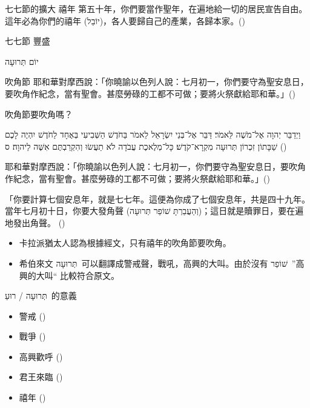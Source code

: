 \documentclass{beamer}
\makeatletter
\newcommand{\biblerefhebrew}[1]{\brm@bibleref{hebrew}{#1}}
\newcommand{\topic}[1]{
\begin{frame}
    \centering
    \vspace*{1cm}
    {\fontsize{40}{48}\selectfont #1\par}
    \vfill
\end{frame}
}
\newcommand{\conclusion}[2]{
\begin{frame}
    \centering
    \vspace*{1cm}
    {\fontsize{40}{48}\selectfont #1 \textemdash #2\par}
    \vfill
\end{frame}
}
\newcommand{\parvspace}{\par\vspace{0.5em}}
\makeatother
\begin{document}
\begin{frame}{七七節的擴大 \textemdash 禧年}
	第五十年，你們要當作\alert{聖年}，在遍地給一切的居民\alert{宣告自由}。這年必為你們的禧年 (\texthebrew{יוֹבֵל})，各人要\alert{歸自己的產業}，\alert{各歸本家}。()
\end{frame}

\conclusion{七七節}{豐盛}

\topic{\texthebrew{יוֹם תְּרוּעָה}}

\begin{frame}{吹角節}
	耶和華對摩西說：「你曉諭以色列人說：\alert{七月初一}，你們要守為\alert{聖安息日}，要吹角作紀念，當有聖會。甚麼勞碌的工都不可做；要將火祭獻給耶和華。」()\parvspace
\end{frame}

\begin{frame}{吹角節要吹角嗎？}
	\begin{hebrew}וַיְדַבֵּר יְהוָה אֶל־מֹשֶׁה לֵּאמֹר׃ דַּבֵּר אֶל־בְּנֵי יִשְׂרָאֵל לֵאמֹר בַּחֹדֶשׁ הַשְּׁבִיעִי בְּאֶחָד לַחֹדֶשׁ יִהְיֶה לָכֶם שַׁבָּתוֹן זִכְרוֹן \alert{תְּרוּעָה} מִקְרָא־קֹדֶשׁ׃ כָּל־מְלֶאכֶת עֲבֹדָה לֹא תַעֲשׂוּ וְהִקְרַבְתֶּם אִשֶּׁה לַיהוָה׃ ס (\biblerefhebrew{Lv 23:23-25})\end{hebrew}\parvspace
	耶和華對摩西說：「你曉諭以色列人說：\alert{七月初一}，你們要守為\alert{聖安息日}，要吹角作紀念，當有聖會。甚麼勞碌的工都不可做；要將火祭獻給耶和華。」()\parvspace
	「你要計算七個安息年，就是七七年。這便為你成了七個安息年，共是四十九年。 當年七月初十日，你要\alert{大發角聲 (\texthebrew{וְהַעֲבַרְתָּ שׁוֹפַר תְּרוּעָה})}；這日就是贖罪日，要在遍地發出角聲。 ()\parvspace
	\begin{itemize}
		\item 卡拉派猶太人認為根據經文，只有禧年的吹角節要吹角。\parencite{Karaism}
		\item 希伯來文 \texthebrew{תְּרוּעָה}\ 可以翻譯成警戒聲，戰吼，高興的大叫。由於沒有 \texthebrew{שׁוֹפַר}\ ”高興的大叫“ 比較符合原文。
	\end{itemize}
\end{frame}

\begin{frame}{\texthebrew{תְּרוּעָה / רוּעַ}\ 的意義}
	\begin{itemize}
		\item 警戒 ()
		\item 戰爭 ()
		\item 高興歡呼 ()
		\item 君王來臨 ()
		\item 禧年 ()
	\end{itemize}
\end{frame}
\end{document}
